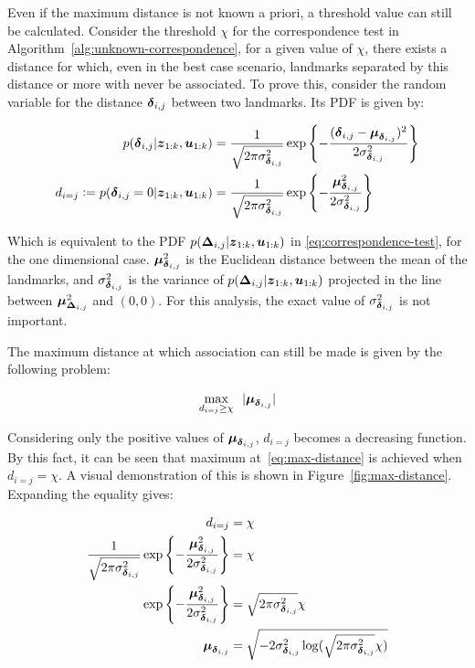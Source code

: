 Even if the maximum distance is not known a priori, a threshold value can still be calculated. Consider the threshold $\chi$ for the correspondence test in Algorithm~\ref{alg:unknown-correspondence}, for a given value of $\chi$, there exists a distance for which, even in the best case scenario, landmarks separated by this distance or more with never be associated. To prove this, consider the random variable for the distance  $\boldsymbol{\delta}_{i,j}$ between two landmarks. Its PDF is given by:

\begin{align}
p(\boldsymbol{\delta}_{i,j}|\boldsymbol{z}_{1:k},\boldsymbol{u}_{1:k})&=
\frac{1}{\sqrt{2\pi\sigma_{\boldsymbol{\delta}_{i,j}}^2}}
\exp\left\lbrace -\frac{(\boldsymbol{\delta}_{i,j}-\boldsymbol{\mu}_{\boldsymbol{\delta}_{i,j}})^2}{2\sigma_{\boldsymbol{\delta}_{i,j}}^2}\right\rbrace\\
d_{i=j} \vcentcolon= p(\boldsymbol{\delta}_{i,j}=0|\boldsymbol{z}_{1:k},\boldsymbol{u}_{1:k})&=
\frac{1}{\sqrt{2\pi\sigma_{\boldsymbol{\delta}_{i,j}}^2}}
\exp\left\lbrace -\frac{\boldsymbol{\mu}_{\boldsymbol{\delta}_{i,j}}^2}{2\sigma_{\boldsymbol{\delta}_{i,j}}^2}\right\rbrace 
\end{align}

Which is equivalent to the PDF $p(\boldsymbol{\Delta}_{i,j}|\boldsymbol{z}_{1:k},\boldsymbol{u}_{1:k})$ in \eqref{eq:correspondence-test}, for the one dimensional case. $\boldsymbol{\mu}_{\boldsymbol{\delta}_{i,j}}^2$ is the Euclidean distance between the mean of the landmarks, and $\sigma_{\boldsymbol{\delta}_{i,j}}^2$ is the variance of $p(\boldsymbol{\Delta}_{i,j}|\boldsymbol{z}_{1:k},\boldsymbol{u}_{1:k})$ projected in the line between $\boldsymbol{\mu}_{\boldsymbol{\Delta}_{i,j}}^2$ and $(0,0)$. For this analysis, the exact value of $\sigma_{\boldsymbol{\delta}_{i,j}}^2$ is not important.

The maximum distance at which association can still be made is given by the following problem:

\begin{equation}
\underset{d_{i=j}\geq\chi}{\text{max}}~~  |\boldsymbol{\mu}_{\boldsymbol{\delta}_{i,j}}|
\label{eq:max-distance}
\end{equation}

Considering only the positive values of $\boldsymbol{\mu}_{\boldsymbol{\delta}_{i,j}}$, $d_{i=j}$ becomes a decreasing function. By this fact, it can be seen that maximum at~\eqref{eq:max-distance} is achieved when $d_{i=j}=\chi$. A visual demonstration of this is shown in Figure~\ref{fig:max-distance}. Expanding the equality gives:

\begin{align}
d_{i=j} &= \chi\\
\frac{1}{\sqrt{2\pi\sigma_{\boldsymbol{\delta}_{i,j}}^2}}
\exp\left\lbrace -\frac{\boldsymbol{\mu}_{\boldsymbol{\delta}_{i,j}}^2}{2\sigma_{\boldsymbol{\delta}_{i,j}}^2}\right\rbrace &= \chi \\
\exp\left\lbrace -\frac{\boldsymbol{\mu}_{\boldsymbol{\delta}_{i,j}}^2}{2\sigma_{\boldsymbol{\delta}_{i,j}}^2}\right\rbrace&= \sqrt{2\pi\sigma_{\boldsymbol{\delta}_{i,j}}^2} \chi\\
\boldsymbol{\mu}_{\boldsymbol{\delta}_{i,j}} &= \sqrt{-2\sigma_{\boldsymbol{\delta}_{i,j}}^2\log(\sqrt{2\pi\sigma_{\boldsymbol{\delta}_{i,j}}^2} \chi)} \label{eq:max-distance-exp}
\end{align}

